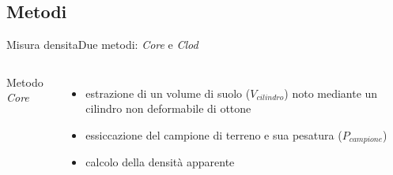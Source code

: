 \documentclass[10pt]{beamer}
\begin{document}
\subsection{Metodi}
\begin{frame}{Misura densita}{Due metodi: \emph{Core} e \emph{Clod}}
  \begin{columns}[c]
     Metodo \emph{Core}
    \pause
    \begin{itemize}[<+->] 
    \item estrazione di un volume di suolo ($V_{cilindro}$) noto mediante un cilindro
      non deformabile di ottone
      \pause
    \item essiccazione del campione di terreno e sua pesatura ($P_{campione}$)
    \item calcolo della densit\`a apparente
    \end{itemize}

\end{columns}
\end{frame}
\end{document}
